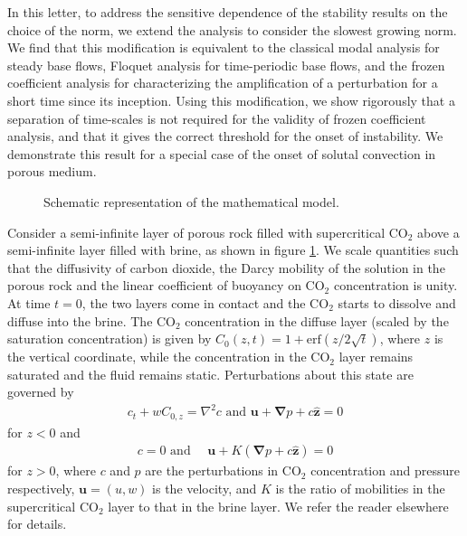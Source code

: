 \documentclass[letterpaper,10pt,prl,twocolumn,aps,reprint]{revtex4-1}
\newcommand{\cotwo}{CO$_2$ }
\newcommand{\erf}{\text{erf}}
\newcommand{\bu}{\boldsymbol{u}}
\newcommand{\bz}{\hat{\boldsymbol{z}}}
\newcommand{\grad}{\boldsymbol{\nabla}}
\begin{document}
In this letter, to address the sensitive dependence of the stability results on the choice of the norm, we extend the analysis to consider the slowest growing norm. We find that this modification is equivalent to the classical modal analysis for steady base flows, Floquet analysis for time-periodic base flows, and the frozen coefficient analysis for characterizing the amplification of a perturbation for a short time since its inception.  Using this modification, we show rigorously that a separation of time-scales is not required for the validity of frozen coefficient analysis, and that it gives the correct threshold for the onset of instability. We demonstrate this result for a special case of the onset of solutal convection in porous medium.

\begin{figure}[b]
\vspace{5cm}
\caption{Schematic representation of the mathematical model.}
\label{fig:Schematic}
\end{figure}

Consider a semi-infinite layer of porous rock filled with supercritical \cotwo above a semi-infinite layer filled with brine, as shown in figure \ref{fig:Schematic}. We scale quantities such that the diffusivity of carbon dioxide, the Darcy mobility of the solution in the porous rock and the linear coefficient of buoyancy on \cotwo concentration is unity. At time $t=0$, the two layers come in contact and the \cotwo starts to dissolve and diffuse into the brine. The \cotwo concentration in the diffuse layer (scaled by the saturation concentration) is given by $C_0(z,t) = 1 + \erf( {z}/{2\sqrt{t}})$, where $z$ is the vertical coordinate, while the concentration in the \cotwo layer remains saturated and the fluid remains static. Perturbations about this state are governed by 
\begin{align}
 c_t + w C_{0,z} = \nabla^2 c \text{ and }
 \bu + \grad p + c\bz = 0
\end{align}
for $z<0$ and 
\begin{align}
 c = 0 \text{ and } \quad \bu + K (\grad p + c\bz) = 0
\end{align}
for $z>0$, where $c$ and $p$ are the perturbations in \cotwo concentration and pressure respectively, $\bu = (u,w)$ is the velocity, and $K$ is the ratio of mobilities in the supercritical \cotwo layer to that in the brine layer. We refer the reader elsewhere\cite{SlimRama10} for details. 
\end{document}
